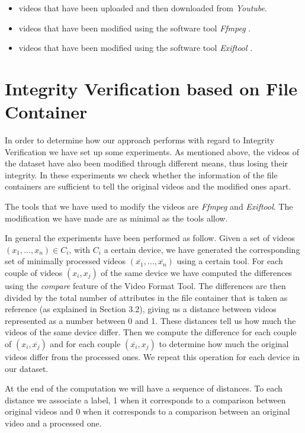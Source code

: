 \begin{itemize}
\item videos that have been uploaded and then downloaded from 	\emph{Youtube}.
\item videos that have been modified using the software tool \emph{Ffmpeg} \cite{ffmpeg}.
\item videos that have been modified using the software tool \emph{Exiftool} \cite{exiftool}.
\end{itemize}

\section{Integrity Verification based on File Container}

In order to determine how our approach performs with regard to Integrity Verification we have set up some experiments. As mentioned above, the videos of the dataset have also been modified through different means, thus losing their integrity. In these experiments we check whether the information of the file containers are sufficient to tell the original videos and the modified ones apart.

The tools that we have used to modify the videos are \emph{Ffmpeg} and \emph{Exiftool}. The modification we have made are as minimal as the tools allow.

In general the experiments have been performed as follow. Given a set of videos $(x_{1},\ldots,x_{n}) \in C_{i}$, with $C_{i}$ a certain device, we have generated the corresponding set of minimally processed videos $(\overline{x_{1}},\ldots,\overline{x_{n}})$ using a certain tool. For each couple of videos $(x_{i}, x_{j})$ of the same device we have computed the differences using the \emph{compare} feature of the Video Format Tool. The differences are then divided by the total number of attributes in the file container that is taken as reference (as explained in Section 3.2), giving us a distance between videos represented as a number between 0 and 1. These distances tell us how much the videos of the same device differ. Then we compute the difference for each couple of $(x_{i}, \overline{x_{j}})$ and for each couple $(\overline{x_{i}}, x_{j})$ to determine how much the original videos differ from the processed ones. We repeat this operation for each device in our dataset.

At the end of the computation we will have a sequence of distances. To each distance we associate a label, 1 when it corresponds to a comparison between original videos and 0 when it corresponds to a comparison between an original video and a processed one.

